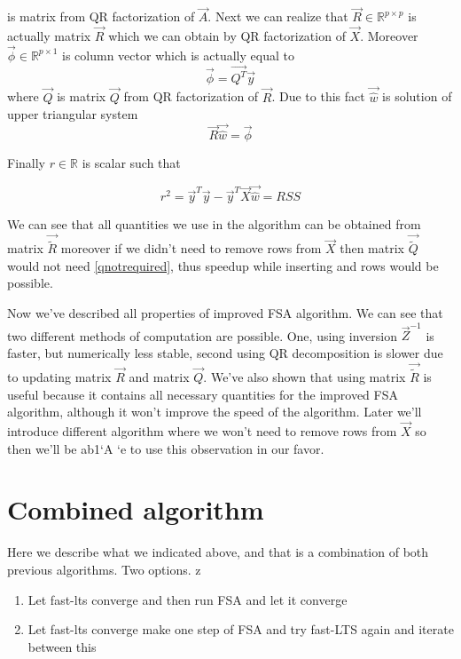is matrix from QR factorization of $\vec{A}$. 
Next we can realize that $\vec{R} \in \mathbb{R}^{p \times p}$ is actually matrix $\vec{R}$ which we can obtain by QR factorization of $\vec{X}$. 
Moreover $\vec{\phi} \in \mathbb{R}^{p \times 1}$ is column vector which is actually equal to
\begin{equation}
	\vec{\phi} =  \vec{Q^T}\vec{y}
\end{equation}
where $\vec{Q}$ is matrix $\vec{Q}$ from QR factorization of $\vec{R}$.
Due to this fact $\vec{\hat{w}}$ is solution of upper triangular system 
\begin{equation}
	\vec{R}\vec{\hat{w}} = \vec{\phi}
\end{equation}

Finally $r \in \mathbb{R}$ is scalar such that 

\begin{equation}
	r^2 = \vec{y}^T\vec{y} - \vec{y}^T\vec{X}\vec{\hat{w}} = RSS
\end{equation}

\begin{remark} \label{qnotrequiredspeedupremark}
	We can see that all quantities we use in the algorithm can be obtained from matrix $\vec{\tilde{R}}$ moreover if we didn't need to remove rows from $\vec{X}$ then matrix $\vec{\tilde{Q}}$ would not need \ref{qnotrequired}, thus speedup while inserting and rows would be possible. 
\end{remark}

Now we've described all properties of improved FSA algorithm. We can see that two different methods of computation are possible. One, using inversion $\vec{Z}^{-1}$ is faster, but numerically less stable, second using QR decomposition is slower due to updating matrix $\vec{R}$ and matrix $\vec{Q}$. We've also shown that using matrix $\vec{\tilde{R}}$ is useful because it contains all necessary quantities for the improved FSA algorithm, although it won't improve the speed of the algorithm. Later we'll introduce different algorithm where we won't need to remove rows from $\vec{X}$ so then we'll be ab1`A																		`e to use this observation in our favor.


\section{Combined algorithm}
Here we describe what we indicated above, and that is a combination of both previous algorithms.
Two options. 
z
\begin{enumerate}
    \item Let fast-lts converge and then run FSA and let it converge
    \item Let fast-lts converge make one step of FSA and try fast-LTS again and iterate between this
\end{enumerate}


